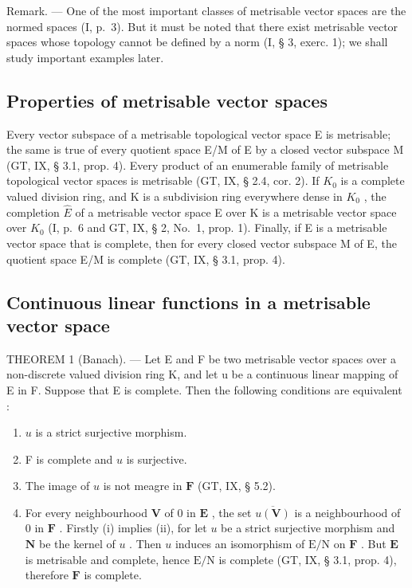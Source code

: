 Remark. --- One of the most important classes of metrisable vector spaces are the normed spaces (I, p.~3). But it must be noted that there exist metrisable vector spaces whose topology cannot be defined by a norm (I, § 3, exerc. 1); we shall study important examples later.

\subsection{Properties of metrisable vector spaces}

Every vector subspace of a metrisable topological vector space E is metrisable; the same is true of every quotient space E/M of E by a closed vector subspace M (GT, IX, § 3.1, prop. 4). Every product of an enumerable family of metrisable topological vector spaces is metrisable (GT, IX, § 2.4, cor. 2). If \(K_{0}\) is a complete valued division ring, and K is a subdivision ring everywhere dense in \(K_{0}\) , the completion \(\hat{E}\) of a metrisable vector space E over K is a metrisable vector space over \(K_{0}\) (I, p.~6 and GT, IX, § 2, No.~1, prop. 1). Finally, if E is a metrisable vector space that is complete, then for every closed vector subspace M of E, the quotient space E/M is complete (GT, IX, § 3.1, prop. 4).

\subsection{Continuous linear functions in a metrisable vector space}

THEOREM 1 (Banach). --- Let E and F be two metrisable vector spaces over a non-discrete valued division ring K, and let u be a continuous linear mapping of E in F. Suppose that E is complete. Then the following conditions are equivalent :

\begin{enumerate}
\def\labelenumi{(\roman{enumi})}
\item
  \(u\) is a strict surjective morphism.
\item
  F is complete and \(u\) is surjective.
\item
  The image of \(u\) is not meagre in \(\mathbf{F}\) (GT, IX, § 5.2).
\item
  For every neighbourhood \(\mathbf{V}\) of 0 in \(\mathbf{E}\) , the set \(\overline{u(\mathbf{V})}\) is a neighbourhood of 0 in \(\mathbf{F}\) . Firstly (i) implies (ii), for let \(u\) be a strict surjective morphism and \(\mathbf{N}\) be the kernel of \(u\) . Then \(u\) induces an isomorphism of \(\mathrm{E/N}\) on \(\mathbf{F}\) . But \(\mathbf{E}\) is metrisable and complete, hence \(\mathrm{E/N}\) is complete (GT, IX, § 3.1, prop. 4), therefore \(\mathbf{F}\) is complete.
\end{enumerate}

